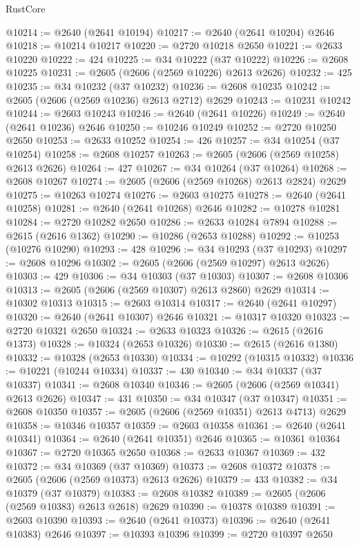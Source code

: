 \begin{lexlean}{RustCore}
\begin{coremodule}
@10214 := @2640 (@2641 @10194)
@10217 := @2640 (@2641 @10204) @2646
@10218 := @10214 @10217
@10220 := @2720 @10218 @2650
@10221 := @2633 @10220
@10222 := 424
@10225 := @34 @10222 (@37 @10222)
@10226 := @2608 @10225
@10231 := @2605 (@2606 (@2569 @10226) @2613 @2626)
@10232 := 425
@10235 := @34 @10232 (@37 @10232)
@10236 := @2608 @10235
@10242 := @2605 (@2606 (@2569 @10236) @2613 @2712) @2629
@10243 := @10231 @10242
@10244 := @2603 @10243
@10246 := @2640 (@2641 @10226)
@10249 := @2640 (@2641 @10236) @2646
@10250 := @10246 @10249
@10252 := @2720 @10250 @2650
@10253 := @2633 @10252
@10254 := 426
@10257 := @34 @10254 (@37 @10254)
@10258 := @2608 @10257
@10263 := @2605 (@2606 (@2569 @10258) @2613 @2626)
@10264 := 427
@10267 := @34 @10264 (@37 @10264)
@10268 := @2608 @10267
@10274 := @2605 (@2606 (@2569 @10268) @2613 @2824) @2629
@10275 := @10263 @10274
@10276 := @2603 @10275
@10278 := @2640 (@2641 @10258)
@10281 := @2640 (@2641 @10268) @2646
@10282 := @10278 @10281
@10284 := @2720 @10282 @2650
@10286 := @2633 @10284 @7894
@10288 := @2615 (@2616 @1362)
@10290 := @10286 (@2653 @10288)
@10292 := @10253 (@10276 @10290)
@10293 := 428
@10296 := @34 @10293 (@37 @10293)
@10297 := @2608 @10296
@10302 := @2605 (@2606 (@2569 @10297) @2613 @2626)
@10303 := 429
@10306 := @34 @10303 (@37 @10303)
@10307 := @2608 @10306
@10313 := @2605 (@2606 (@2569 @10307) @2613 @2860) @2629
@10314 := @10302 @10313
@10315 := @2603 @10314
@10317 := @2640 (@2641 @10297)
@10320 := @2640 (@2641 @10307) @2646
@10321 := @10317 @10320
@10323 := @2720 @10321 @2650
@10324 := @2633 @10323
@10326 := @2615 (@2616 @1373)
@10328 := @10324 (@2653 @10326)
@10330 := @2615 (@2616 @1380)
@10332 := @10328 (@2653 @10330)
@10334 := @10292 (@10315 @10332)
@10336 := @10221 (@10244 @10334)
@10337 := 430
@10340 := @34 @10337 (@37 @10337)
@10341 := @2608 @10340
@10346 := @2605 (@2606 (@2569 @10341) @2613 @2626)
@10347 := 431
@10350 := @34 @10347 (@37 @10347)
@10351 := @2608 @10350
@10357 := @2605 (@2606 (@2569 @10351) @2613 @4713) @2629
@10358 := @10346 @10357
@10359 := @2603 @10358
@10361 := @2640 (@2641 @10341)
@10364 := @2640 (@2641 @10351) @2646
@10365 := @10361 @10364
@10367 := @2720 @10365 @2650
@10368 := @2633 @10367
@10369 := 432
@10372 := @34 @10369 (@37 @10369)
@10373 := @2608 @10372
@10378 := @2605 (@2606 (@2569 @10373) @2613 @2626)
@10379 := 433
@10382 := @34 @10379 (@37 @10379)
@10383 := @2608 @10382
@10389 := @2605 (@2606 (@2569 @10383) @2613 @2618) @2629
@10390 := @10378 @10389
@10391 := @2603 @10390
@10393 := @2640 (@2641 @10373)
@10396 := @2640 (@2641 @10383) @2646
@10397 := @10393 @10396
@10399 := @2720 @10397 @2650

\end{coremodule}
\end{lexlean}
